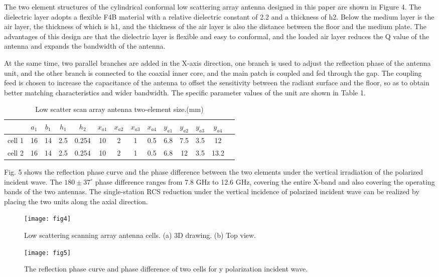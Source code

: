 \documentclass[USenglish]{article}
\theoremstyle{dgthm}
\theoremstyle{dgdef}
\begin{document}
The two element structures of the cylindrical conformal low scattering array antenna designed in this paper are shown in Figure 4. The dielectric layer adopts a flexible F4B material with a relative dielectric constant of 2.2 and a thickness of h2. Below the medium layer is the air layer, the thickness of which is h1, and the thickness of the air layer is also the distance between the floor and the medium plate. The advantages of this design are that the dielectric layer is flexible and easy to conformal, and the loaded air layer reduces the Q value of the antenna and expands the bandwidth of the antenna.


At the same time, two parallel branches are added in the X-axis direction, one branch is used to adjust the reflection phase of the antenna unit, and the other branch is connected to the coaxial inner core, and the main patch is coupled and fed through the gap. The coupling feed is chosen to increase the capacitance of the antenna to offset the sensitivity between the radiant surface and the floor, so as to obtain better matching characteristics and wider bandwidth. The specific parameter values of the unit are shown in Table 1.
\begin{table} [!ht]
	\centering
	\caption{Low scatter scan array antenna two-element size.(mm)}
	\begin{tabular}{cccccccccccccc}
		        &$a_1$  &$b_1$  &$h_1$ &$h_2$ &$x_{a1}$ &$x_{a2}$ &$x_{a3}$ &$x_{a4}$ &$y_{a1}$ &$y_{a2}$  &$y_{a3}$ &$y_{a4}$	\\ \midrule
		cell 1 	&16 	&14 	&2.5    &0.254 &10 &2 &1 &0.5 &6.8 &7.5 &3.5 &12 	\\
		\hline
		cell 2	&16	    &14 	&2.5    &0.254 &10 &2 &1 &0.5 &6.8 &12 &3.5 &13.2			\\
	\end{tabular}
	\label{tab:Table1}
\end{table}


Fig. 5 shows the reflection phase curve and the phase difference between the two elements under the vertical irradiation of the polarized incident wave. The $180\pm37^\circ$ phase difference ranges from 7.8 GHz to 12.6 GHz, covering the entire X-band and also covering the operating bands of the two antennas. The single-station RCS reduction under the vertical incidence of polarized incident wave can be realized by placing the two units along the axial direction.
\begin{figure}
	\centering
	\texttt{[image: fig4]}
	\caption{Low scattering scanning array antenna cells. (a) 3D drawing. (b) Top view.}
\end{figure}
\begin{figure}
	\centering
	\texttt{[image: fig5]}
	\caption{The reflection phase curve and phase difference of two cells for y polarization incident wave.}
\end{figure}
\end{document}
